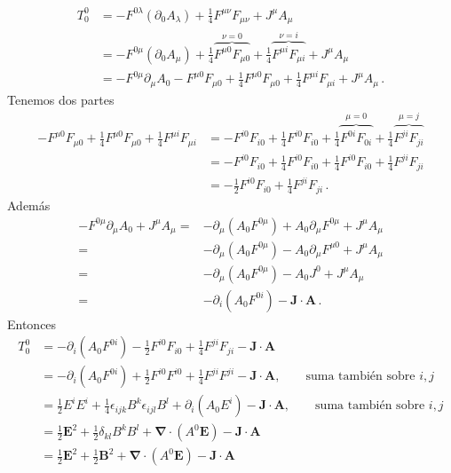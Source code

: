 \begin{align}
T^0_0 &=-F^{0\lambda}(\partial_0A_\lambda)+\frac{1}{4}F^{\mu\nu}F_{\mu\nu}+J^\mu A_\mu\nonumber\\
  &=-F^{0\mu}(\partial_0A_\mu)+\frac{1}{4}\overbrace{F^{\mu0}F_{\mu0}}^{\nu=0}+\frac{1}{4}\overbrace{F^{\mu i}F_{\mu i}}^{\nu=i}+J^\mu A_\mu\nonumber\\
  &=-F^{0\mu}\partial_\mu A_0-F^{\mu0}F_{\mu0}+\frac{1}{4}F^{\mu0}F_{\mu0}+\frac{1}{4}F^{\mu i}F_{\mu i}+J^\mu A_\mu\,.
\end{align}
Tenemos dos partes
\begin{align}
  -F^{\mu0}F_{\mu0}+\frac{1}{4}F^{\mu0}F_{\mu0}+\frac{1}{4}F^{\mu i}F_{\mu i}
  &=-F^{i0}F_{i0}+\frac{1}{4}F^{i0}F_{i0}+\frac{1}{4}\overbrace{F^{0i}F_{0i}}^{\mu=0}+\frac{1}{4}\overbrace{F^{ji}F_{ji}}^{\mu=j}\nonumber\\
  &=-F^{i0}F_{i0}+\frac{1}{4}F^{i0}F_{i0}+\frac{1}{4}{F^{i0}F_{i0}}+\frac{1}{4}{F^{ji}F_{ji}}\nonumber\\
  &=-\frac{1}{2}{F^{i0}F_{i0}}+\frac{1}{4}{F^{ji}F_{ji}}\,.
\end{align}
Además
\begin{align}
  -F^{0\mu}\partial_\mu A_0+J^\mu A_\mu=&-\partial_\mu(A_0 F^{0\mu})+A_0\partial_\mu F^{0\mu}+J^\mu A_\mu\nonumber\\
  =&-\partial_\mu(A_0 F^{0\mu})-A_0\partial_\mu F^{\mu0}+J^\mu A_\mu\nonumber\\
  =&-\partial_\mu(A_0 F^{0\mu})-A_0 J^0+J^\mu A_\mu\nonumber\\
  =&-\partial_i(A_0 F^{0i})-\mathbf{J}\cdot\mathbf{A}\,.
\end{align}
Entonces
\begin{align}
  T^0_0&=-\partial_i(A_0F^{0i})-\frac{1}{2}F^{i0}F_{i0}+\frac{1}{4}F^{ji}F_{ji}-\mathbf{J}\cdot\mathbf{A}\nonumber\\
 &=-\partial_i(A_0F^{0i})+\frac{1}{2}F^{i0}F^{i0}+\frac{1}{4}F^{ji}F^{ji}-\mathbf{J}\cdot\mathbf{A},\qquad\text{suma también sobre $i,j$}\nonumber\\
  &=\frac{1}{2}E^{i}E^{i}+\frac{1}{4}\epsilon_{ijk}B^k\epsilon_{ijl}B^l+\partial_i(A_0E^{i})-\mathbf{J}\cdot\mathbf{A},\qquad\text{suma también sobre $i,j$}\nonumber\\
  &=\frac{1}{2}\mathbf{E}^2+\frac{1}{2}\delta_{kl}B^k B^l+\boldsymbol{\nabla}\cdot(A^0\mathbf{E})-\mathbf{J}\cdot\mathbf{A}\nonumber\\
  &=\frac{1}{2}\mathbf{E}^2+\frac{1}{2}\mathbf{B}^2+\boldsymbol{\nabla}\cdot(A^0\mathbf{E})-\mathbf{J}\cdot\mathbf{A}
\end{align}

